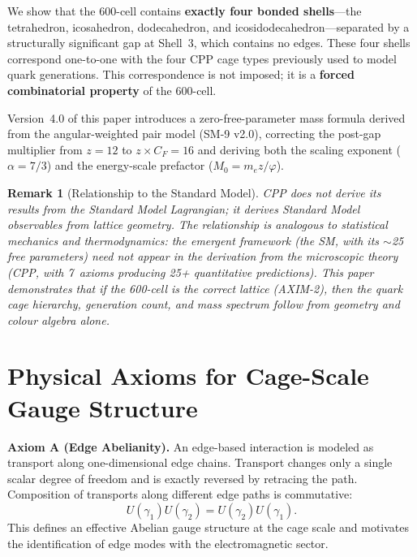 \documentclass[11pt,letterpaper]{article}
\newtheorem{remark}[theorem]{Remark}
\newcommand{\phig}{\varphi}
\begin{document}
We show that the 600-cell contains \textbf{exactly four bonded
shells}---the tetrahedron, icosahedron, dodecahedron, and
icosidodecahedron---separated by a structurally significant gap at
Shell~3, which contains no edges.  These four shells correspond
one-to-one with the four CPP cage types previously used to model
quark generations.  This correspondence is not imposed; it is a
\textbf{forced combinatorial property} of the 600-cell.

Version~4.0 of this paper introduces a zero-free-parameter mass
formula derived from the angular-weighted pair model (SM-9 v2.0),
correcting the post-gap multiplier from $z = 12$ to
$z \times C_F = 16$ and deriving both the scaling exponent
($\alpha = 7/3$) and the energy-scale prefactor
($M_0 = m_e z/\phig$).

\begin{remark}[Relationship to the Standard Model]
CPP does not derive its results from the Standard Model Lagrangian;
it derives Standard Model observables from lattice geometry.  The
relationship is analogous to statistical mechanics and
thermodynamics: the emergent framework (the SM, with its $\sim$25
free parameters) need not appear in the derivation from the
microscopic theory (CPP, with 7~axioms producing 25+ quantitative
predictions).  This paper demonstrates that \emph{if} the 600-cell
is the correct lattice (AXIM-2), \emph{then} the quark cage
hierarchy, generation count, and mass spectrum follow from geometry
and colour algebra alone.
\end{remark}

\section{Physical Axioms for Cage-Scale Gauge Structure}
\label{sec:axioms}

\textbf{Axiom A (Edge Abelianity).}
An edge-based interaction is modeled as transport along
one-dimensional edge chains.  Transport changes only a single
scalar degree of freedom and is exactly reversed by retracing the
path.  Composition of transports along different edge paths is
commutative:
\begin{equation}
U(\gamma_1)U(\gamma_2)=U(\gamma_2)U(\gamma_1).
\end{equation}
This defines an effective Abelian gauge structure at the cage scale
and motivates the identification of edge modes with the
electromagnetic sector.
\end{document}
